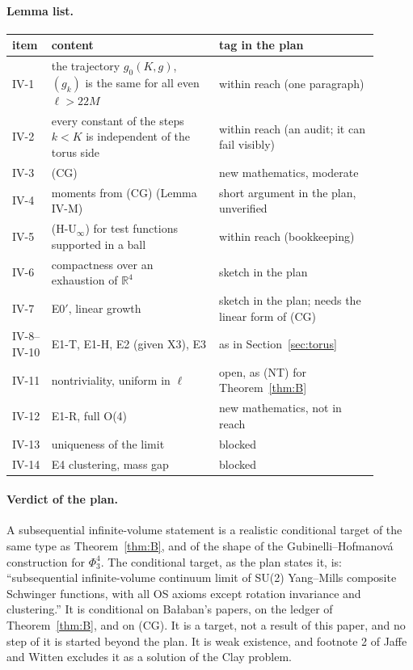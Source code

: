 \paragraph{Lemma list.}
{\small
\begin{longtable}{p{0.08\linewidth}p{0.42\linewidth}p{0.4\linewidth}}
\hline
item & content & tag in the plan \\ \hline \endhead
IV-1 & the trajectory $g_0(K,g)$, $(g_k)$ is the same for all even $\ell>22M$ & within reach (one paragraph) \\
IV-2 & every constant of the steps $k<K$ is independent of the torus side & within reach (an audit; it can fail visibly) \\
IV-3 & (CG) & new mathematics, moderate \\
IV-4 & moments from (CG) (Lemma IV-M) & short argument in the plan, unverified \\
IV-5 & (H-U$_\infty$) for test functions supported in a ball & within reach (bookkeeping) \\
IV-6 & compactness over an exhaustion of $\mathbb R^4$ & sketch in the plan \\
IV-7 & E0$'$, linear growth & sketch in the plan; needs the linear form of (CG) \\
IV-8--IV-10 & E1-T, E1-H, E2 (given X3), E3 & as in Section~\ref{sec:torus} \\
IV-11 & nontriviality, uniform in $\ell$ & open, as (NT) for Theorem~\ref{thm:B} \\
IV-12 & E1-R, full O(4) & new mathematics, not in reach \\
IV-13 & uniqueness of the limit & blocked \\
IV-14 & E4 clustering, mass gap & blocked \\ \hline
\end{longtable}}

\paragraph{Verdict of the plan.} A subsequential infinite-volume statement is a realistic conditional target of the same type as Theorem~\ref{thm:B}, and of the shape of the Gubinelli--Hofmanov\'a construction for $\Phi^4_3$. The conditional target, as the plan states it, is: ``subsequential infinite-volume continuum limit of SU(2) Yang--Mills composite Schwinger functions, with all OS axioms except rotation invariance and clustering.'' It is conditional on Ba{\l}aban's papers, on the ledger of Theorem~\ref{thm:B}, and on (CG). It is a target, not a result of this paper, and no step of it is started beyond the plan. It is weak existence, and footnote 2 of Jaffe and Witten \cite{jaffewitten} excludes it as a solution of the Clay problem.

